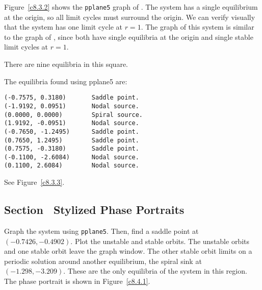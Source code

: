 \documentclass{ximera}
\begin{document}
Figure~\ref{c8.3.2} shows the {\tt pplane5} graph of .
The system has a single equilibrium at the origin, so all limit cycles
must surround the origin.  We can verify visually that the system has
one limit cycle at $r = 1$.  The graph of this system is similar to
the graph of , since both
have single equilibria at the origin and single stable limit cycles at
$r = 1$.

\begin{figure}[htb]
                       \centerline{%
                       }
\end{figure}

\ans There are nine equilibria in this square.

\soln  The equilibria found using {\sf pplane5} are:
\begin{verbatim}
(-0.7575, 0.3180)       Saddle point.            
(-1.9192, 0.0951)       Nodal source.            
(0.0000, 0.0000)        Spiral source.           
(1.9192, -0.0951)       Nodal source.            
(-0.7650, -1.2495)      Saddle point.            
(0.7650, 1.2495)        Saddle point.            
(0.7575, -0.3180)       Saddle point.            
(-0.1100, -2.6084)      Nodal source.            
(0.1100, 2.6084)        Nodal source.            
\end{verbatim}
See Figure~\ref{c8.3.3}.

\begin{figure}[htb]
                       \centerline{%
                       }
\end{figure}


\subsection*{Section~\protect{\ref{S:SPP}} Stylized Phase Portraits}

Graph the system using {\tt pplane5}.  Then, find a saddle point at
$(-0.7426,-0.4902)$.  Plot the unstable and stable orbits.  The unstable
orbits and one stable orbit leave the graph window.  The other stable
orbit limits on a periodic solution around another equilibrium, the
spiral sink at $(-1.298,-3.209)$.  These are the only equilibria of
the system in this region.  The phase portrait is shown in
Figure~\ref{c8.4.1}.
\end{document}
